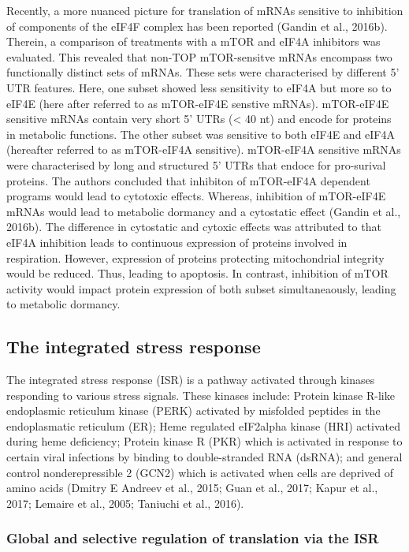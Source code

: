 \documentclass[12pt,openany]{book}
\begin{document}
Recently, a more nuanced picture for translation of mRNAs sensitive to
inhibition of components of the eIF4F complex has been reported (Gandin
et al., 2016b). Therein, a comparison of treatments with a mTOR and
eIF4A inhibitors was evaluated. This revealed that non-TOP mTOR-sensitve
mRNAs encompass two functionally distinct sets of mRNAs. These sets were
characterised by different 5' UTR features. Here, one subset showed less
sensitivity to eIF4A but more so to eIF4E (here after referred to as
mTOR-eIF4E senstive mRNAs). mTOR-eIF4E sensitive mRNAs contain very
short 5' UTRs (\textless{} 40 nt) and encode for proteins in metabolic
functions. The other subset was sensitive to both eIF4E and eIF4A
(hereafter referred to as mTOR-eIF4A sensitive). mTOR-eIF4A sensitive
mRNAs were characterised by long and structured 5' UTRs that endoce for
pro-surival proteins. The authors concluded that inhibiton of mTOR-eIF4A
dependent programs would lead to cytotoxic effects. Whereas, inhibition
of mTOR-eIF4E mRNAs would lead to metabolic dormancy and a cytostatic
effect (Gandin et al., 2016b). The difference in cytostatic and cytoxic
effects was attributed to that eIF4A inhibition leads to continuous
expression of proteins involved in respiration. However, expression of
proteins protecting mitochondrial integrity would be reduced. Thus,
leading to apoptosis. In contrast, inhibition of mTOR activity would
impact protein expression of both subset simultaneaously, leading to
metabolic dormancy.

\subsection{The integrated stress response}

The integrated stress response (ISR) is a pathway activated through
kinases responding to various stress signals. These kinases include:
Protein kinase R-like endoplasmic reticulum kinase (PERK) activated by
misfolded peptides in the endoplasmatic reticulum (ER); Heme regulated
eIF2alpha kinase (HRI) activated during heme deficiency; Protein kinase
R (PKR) which is activated in response to certain viral infections by
binding to double-stranded RNA (dsRNA); and general control
nonderepressible 2 (GCN2) which is activated when cells are deprived of
amino acids (Dmitry E Andreev et al., 2015; Guan et al., 2017; Kapur et
al., 2017; Lemaire et al., 2005; Taniuchi et al., 2016).

\subsubsection{Global and selective regulation of translation via the ISR}
\end{document}
